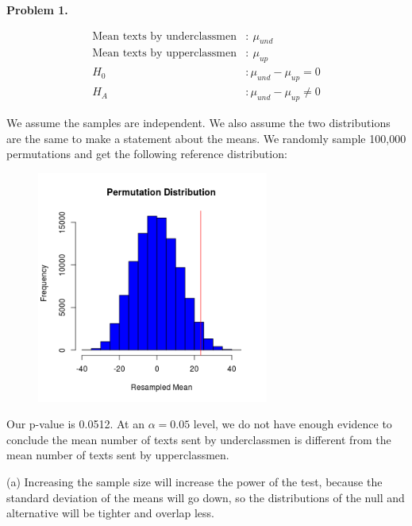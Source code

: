 \documentclass[11pt]{article}
\begin{document}
 \medskip

\noindent \textbf{Problem 1.}

\begin{align*}
\textrm{Mean texts by underclassmen}&: \> \mu_{und}\\
\textrm{Mean texts by upperclassmen}&: \> \mu_{up}\\
H_0&: \mu_{und} - \mu_{up} = 0\\
H_A&: \mu_{und} - \mu_{up} \ne 0
\end{align*}

We assume the samples are independent.  We also assume the two distributions are the same to make a statement about the means.  We randomly sample 100,000 permutations and get the following reference distribution:

\begin{figure}[h!]
\includegraphics[width=3in]{permutations.png}
\end{figure}

Our p-value is 0.0512.  At an $\alpha = 0.05$ level, we do not have enough evidence to conclude the mean number of texts sent by underclassmen is different from the mean number of texts sent by upperclassmen.

\pagebreak



\vspace{0.1in}

\noindent (a) Increasing the sample size will increase the power of the test, because the standard deviation of the means will go down, so the distributions of the null and alternative will be tighter and overlap less.

\vspace{0.1in}
\end{document}
